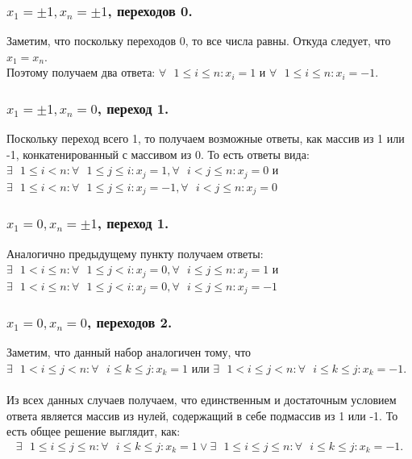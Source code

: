 \documentclass[12pt, a4paper]{article}
\begin{document}
{            \subsubsection{\texorpdfstring{$x_1 = \pm 1, x_n=\pm 1$}{Lg}, переходов 0.}
                Заметим, что поскольку переходов 0, то все числа равны. Откуда следует, что $x_1 = x_n$.\\
                Поэтому получаем два ответа: $\forall \text{ } 1 \leq i \leq n : x_i=1$ и $\forall \text{ } 1 \leq i \leq n : x_i=-1$.
            \subsubsection{\texorpdfstring{$x_1 = \pm1, x_n = 0$}{Lg}, переход 1.}
                Поскольку переход всего 1, то получаем возможные ответы, как массив из 1 или -1, конкатенированный с массивом из 0.
                То есть ответы вида: $\exists \text{ } 1 \leq i < n : \forall \text{ } 1 \leq j \leq i : x_j=1, \forall \text{ } i < j \leq n : x_j=0$ и $\exists \text{ } 1 \leq i < n : \forall \text{ } 1 \leq j \leq i : x_j=-1, \forall \text{ } i < j \leq n : x_j=0$
            \subsubsection{\texorpdfstring{$x_1 = 0, x_n=\pm 1$, переход 1.}{Lg}}
                Аналогично предыдущему пункту получаем ответы: $\exists \text{ } 1 < i \leq n : \forall \text{ } 1 \leq j < i : x_j=0, \forall \text{ } i \leq j \leq n : x_j=1$ и $\exists \text{ } 1 < i \leq n : \forall \text{ } 1 \leq j < i : x_j=0, \forall \text{ } i \leq j \leq n : x_j=-1$
            \subsubsection{\texorpdfstring{$x_1 = 0, x_n = 0$}{Lg}, переходов 2.}
                Заметим, что данный набор аналогичен тому, что $\exists \text{ } 1 < i \leq j < n : \forall \text{ } i \leq k \leq j : x_k = 1$ или $\exists \text{ } 1 < i \leq j < n : \forall \text{ } i \leq k \leq j : x_k = -1$.\\
            \\
            Из всех данных случаев получаем, что единственным и достаточным условием ответа является массив из нулей, содержащий в себе подмассив из 1 или -1. То есть общее решение выглядит, как:
            \begin{gather*}\exists \text{ } 1 \leq i \leq j \leq n : \forall \text{ } i \leq k \leq j : x_k = 1 \lor \exists \text{ } 1 \leq i \leq j \leq n : \forall \text{ } i \leq k \leq j : x_k = -1.\end{gather*}
}
\end{document}
